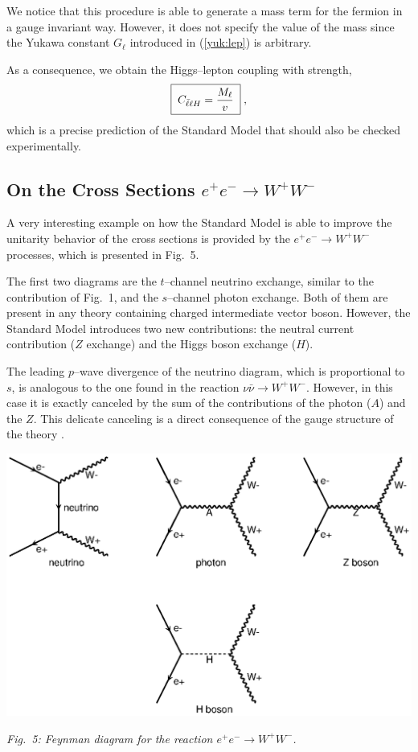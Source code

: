 \documentclass[12pt]{report}
\begin{document}
We notice that this procedure is able to generate a mass term for the
fermion in a gauge invariant way. However, it does not specify the
value of the mass since the Yukawa constant $G_\ell$ introduced in
(\ref{yuk:lep}) is arbitrary.

As a consequence, we obtain the Higgs--lepton coupling with strength,
\begin{equation}
\fbox{$ \; \displaystyle{C_{\bar{\ell}\ell H} = \frac{M_\ell}{v}} \; $} \; ,
\label{hl}
\end{equation}
which is a precise prediction of the Standard Model that should also
be checked experimentally.


\subsection{On the Cross Sections $e^+ e^- \to W^+ W^-$} \indent

A very interesting example on how the Standard Model is able to
improve the unitarity behavior of the cross sections is provided by
the $e^+ e^- \to W^+ W^-$ processes, which is presented in Fig.\ 5.

The first two diagrams are the $t$--channel neutrino exchange,
similar to the contribution of Fig.\ 1, and the $s$--channel photon
exchange.   Both of them are present in any theory containing charged
intermediate vector boson. However, the Standard Model introduces two
new contributions: the neutral current contribution ($Z$ exchange)
and the Higgs boson exchange ($H$).

The leading $p$--wave  divergence of the neutrino diagram, which is
proportional to $s$, is analogous to the one found in the reaction
$\nu \bar{\nu} \to W^+ W^-$. However, in this case it  is exactly 
canceled by the sum of the contributions of the photon ($A$) and the
$Z$. This delicate canceling is a direct consequence of the gauge
structure of the theory \cite{Llwellyn:73}.

\includegraphics[scale=0.8]{fig05.eps}
\vskip 0.3cm
\begin{minipage}[h]{12cm}
\begin{center}
{\it Fig.\ 5: Feynman diagram for the reaction $e^+ e^- \to W^+ W^-$.}
\end{center}
\end{minipage}
\end{document}
